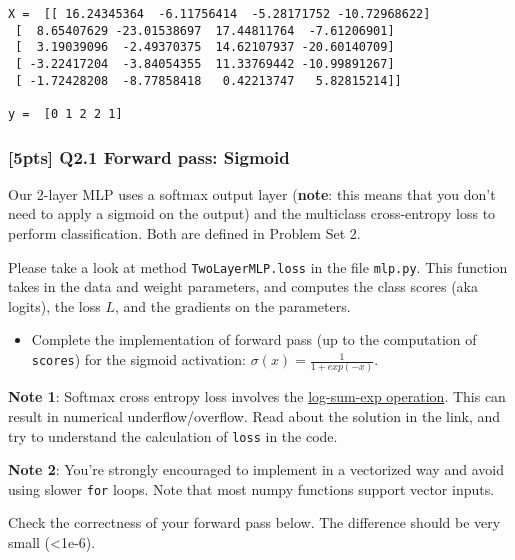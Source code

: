 \documentclass[11pt]{article}
\providecommand{\tightlist}{%
      \setlength{\itemsep}{0pt}\setlength{\parskip}{0pt}}
\begin{document}
    \begin{Verbatim}[commandchars=\\\{\}]
X =  [[ 16.24345364  -6.11756414  -5.28171752 -10.72968622]
 [  8.65407629 -23.01538697  17.44811764  -7.61206901]
 [  3.19039096  -2.49370375  14.62107937 -20.60140709]
 [ -3.22417204  -3.84054355  11.33769442 -10.99891267]
 [ -1.72428208  -8.77858418   0.42213747   5.82815214]]

y =  [0 1 2 2 1]

    \end{Verbatim}

    \hypertarget{pts-q2.1-forward-pass-sigmoid}{%
\subsubsection{{[}5pts{]} Q2.1 Forward pass:
Sigmoid}\label{pts-q2.1-forward-pass-sigmoid}}

Our 2-layer MLP uses a softmax output layer (\textbf{note}: this means
that you don't need to apply a sigmoid on the output) and the multiclass
cross-entropy loss to perform classification. Both are defined in
Problem Set 2.

Please take a look at method \texttt{TwoLayerMLP.loss} in the file
\texttt{mlp.py}. This function takes in the data and weight parameters,
and computes the class scores (aka logits), the loss \(L\), and the
gradients on the parameters.

\begin{itemize}
\tightlist
\item
  Complete the implementation of forward pass (up to the computation of
  \texttt{scores}) for the sigmoid activation:
  \(\sigma(x)=\frac{1}{1+exp(-x)}\).
\end{itemize}

\textbf{Note 1}: Softmax cross entropy loss involves the
\href{https://en.wikipedia.org/wiki/LogSumExp}{log-sum-exp operation}.
This can result in numerical underflow/overflow. Read about the solution
in the link, and try to understand the calculation of \texttt{loss} in
the code.

\textbf{Note 2}: You're strongly encouraged to implement in a vectorized
way and avoid using slower \texttt{for} loops. Note that most numpy
functions support vector inputs.

Check the correctness of your forward pass below. The difference should
be very small (\textless{}1e-6).
\end{document}

